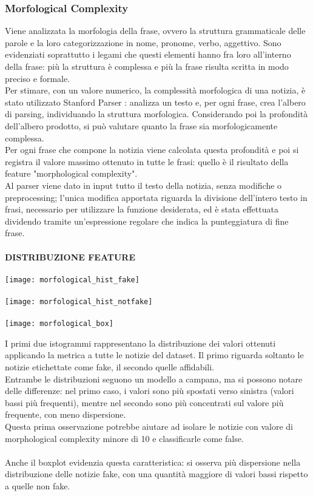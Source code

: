 \documentclass{article}
\begin{document}
\begin{multicols}{2}
				\subsubsection{Morfological Complexity}
					Viene analizzata la morfologia della frase, ovvero la struttura grammaticale delle parole e la loro categorizzazione in nome, pronome, verbo, aggettivo. Sono evidenziati soprattutto i legami che questi elementi hanno fra loro all'interno della frase: più la struttura è complessa e più la frase risulta scritta in modo preciso e formale.\\
					Per stimare, con un valore numerico, la complessità morfologica di una notizia, è stato utilizzato Stanford Parser \cite{stanfordparser}: analizza un testo e, per ogni frase, crea l'albero di parsing, individuando la struttura morfologica. Considerando poi la profondità dell'albero prodotto, si può valutare quanto la frase sia morfologicamente complessa.\\
					Per ogni frase che compone la notizia viene calcolata questa profondità e poi si registra il valore massimo ottenuto in tutte le frasi: quello è il risultato della feature "morphological complexity".\\
					Al parser viene dato in input tutto il testo della notizia, senza modifiche o preprocessing; l'unica modifica apportata riguarda la divisione dell'intero testo in frasi, necessario per utilizzare la funzione desiderata, ed è stata effettuata dividendo tramite un'espressione regolare che indica la punteggiatura di fine frase.
					\\~\\
					\textbf{DISTRIBUZIONE FEATURE}
					\\~\\
					\texttt{[image: morfological\_hist\_fake]}
					\\~\\
					\texttt{[image: morfological\_hist\_notfake]}
					\\~\\
					\texttt{[image: morfological\_box]}
					
					I primi due istogrammi rappresentano la distribuzione dei valori ottenuti applicando la metrica a tutte le notizie del dataset. Il primo riguarda soltanto le notizie etichettate come fake, il secondo quelle affidabili.\\
					Entrambe le distribuzioni seguono un modello a campana, ma si possono notare delle differenze: nel primo caso, i valori sono più spostati verso sinistra (valori bassi più frequenti), mentre nel secondo sono più concentrati sul valore più frequente, con meno dispersione.\\
					Questa prima osservazione potrebbe aiutare ad isolare le notizie con valore di morphological complexity minore di 10 e classificarle come false.
					\\~\\
					Anche il boxplot evidenzia questa caratteristica: si osserva più dispersione nella distribuzione delle notizie fake, con una quantità maggiore di valori bassi rispetto a quelle non fake.
					

\end{multicols}
\end{document}
